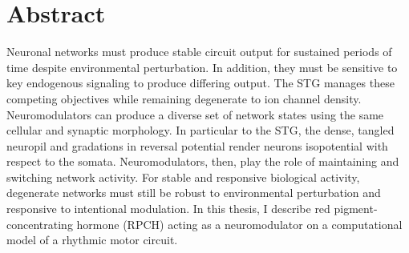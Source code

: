 \begingroup
\let\clearpage\relax
\let\cleardoublepage\relax
\let\cleardoublepage\relax

\chapter*{Abstract}
Neuronal networks must produce stable circuit output for sustained periods of time despite environmental perturbation. In addition, they must be sensitive to key endogenous signaling to produce differing output. The \acs{STG} manages these competing objectives while remaining degenerate to ion channel density. Neuromodulators can produce a diverse set of network states using the same cellular and synaptic morphology. In particular to the \acs{STG}, the dense, tangled neuropil and gradations in reversal potential render neurons isopotential with respect to the somata. Neuromodulators, then, play the role of maintaining and switching network activity. For stable and responsive biological activity, degenerate networks must still be robust to environmental perturbation and responsive to intentional modulation. In this thesis, I describe red pigment-concentrating hormone (\acs{RPCH}) acting as a neuromodulator on a computational model of a rhythmic motor circuit.

\vfill

\endgroup

\vfill
